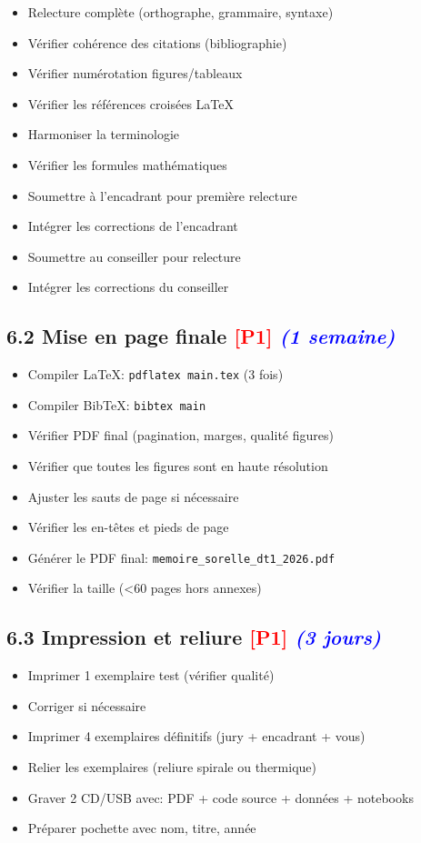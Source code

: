\documentclass[a4paper,11pt]{article}
\newcommand{\checkbox}{\large$\square$}
\newcommand{\priorite}[1]{\textcolor{red}{\textbf{[#1]}}}
\newcommand{\duree}[1]{\textcolor{blue}{\textit{(#1)}}}
\begin{document}
\begin{itemize}[label=\checkbox]
    \item Relecture complète (orthographe, grammaire, syntaxe)
    \item Vérifier cohérence des citations (bibliographie)
    \item Vérifier numérotation figures/tableaux
    \item Vérifier les références croisées LaTeX
    \item Harmoniser la terminologie
    \item Vérifier les formules mathématiques
    \item Soumettre à l'encadrant pour première relecture
    \item Intégrer les corrections de l'encadrant
    \item Soumettre au conseiller pour relecture
    \item Intégrer les corrections du conseiller
\end{itemize}

\subsection*{6.2 Mise en page finale \priorite{P1} \duree{1 semaine}}

\begin{itemize}[label=\checkbox]
    \item Compiler LaTeX: \texttt{pdflatex main.tex} (3 fois)
    \item Compiler BibTeX: \texttt{bibtex main}
    \item Vérifier PDF final (pagination, marges, qualité figures)
    \item Vérifier que toutes les figures sont en haute résolution
    \item Ajuster les sauts de page si nécessaire
    \item Vérifier les en-têtes et pieds de page
    \item Générer le PDF final: \texttt{memoire\_sorelle\_dt1\_2026.pdf}
    \item Vérifier la taille (<60 pages hors annexes)
\end{itemize}

\subsection*{6.3 Impression et reliure \priorite{P1} \duree{3 jours}}

\begin{itemize}[label=\checkbox]
    \item Imprimer 1 exemplaire test (vérifier qualité)
    \item Corriger si nécessaire
    \item Imprimer 4 exemplaires définitifs (jury + encadrant + vous)
    \item Relier les exemplaires (reliure spirale ou thermique)
    \item Graver 2 CD/USB avec: PDF + code source + données + notebooks
    \item Préparer pochette avec nom, titre, année
\end{itemize}
\end{document}
